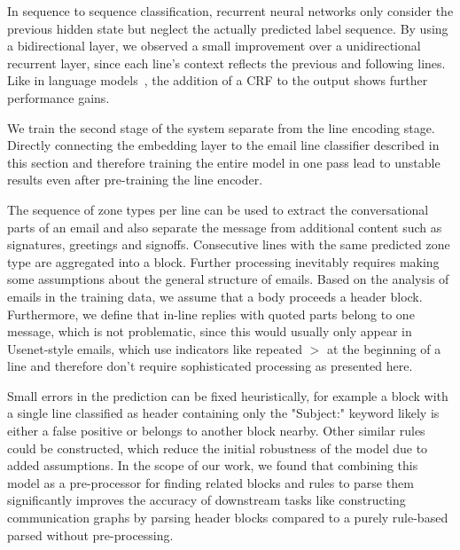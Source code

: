 \documentclass{llncs}
\begin{document}
In sequence to sequence classification, recurrent neural networks only consider the previous hidden state but neglect the actually predicted label sequence.
By using a bidirectional layer, we observed a small improvement over a unidirectional recurrent layer, since each line's context reflects the previous and following lines.
Like in language models~\cite{lstm_crf,lstm_cnn_crf}, the addition of a CRF to the output shows further performance gains.

We train the second stage of the system separate from the line encoding stage.
Directly connecting the embedding layer to the email line classifier described in this section and therefore training the entire model in one pass lead to unstable results even after pre-training the line encoder.

The sequence of zone types per line can be used to extract the conversational parts of an email and also separate the message from additional content such as signatures, greetings and signoffs.
Consecutive lines with the same predicted zone type are aggregated into a block.
Further processing inevitably requires making some assumptions about the general structure of emails.
Based on the analysis of emails in the training data, we assume that a body proceeds a header block.
Furthermore, we define that in-line replies with quoted parts belong to one message, which is not problematic, since this would usually only appear in Usenet-style emails, which use indicators like repeated $>$ at the beginning of a line and therefore don't require sophisticated processing as presented here.

Small errors in the prediction can be fixed heuristically, for example a block with a single line classified as header containing only the "Subject:" keyword likely is either a false positive or belongs to another block nearby.
Other similar rules could be constructed, which reduce the initial robustness of the model due to added assumptions.
In the scope of our work, we found that combining this model as a pre-processor for finding related blocks and rules to parse them significantly improves the accuracy of downstream tasks like constructing communication graphs by parsing header blocks compared to a purely rule-based parsed without pre-processing.


\end{document}
